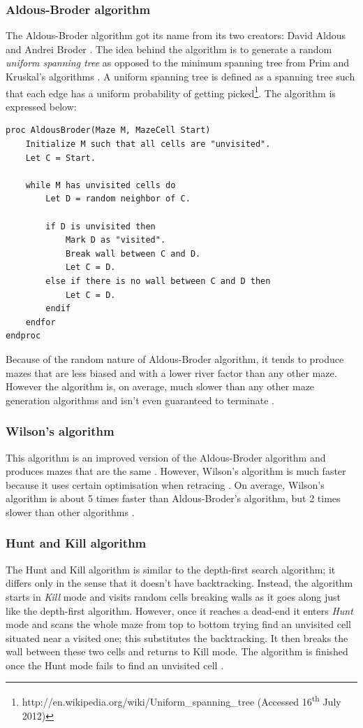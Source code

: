 \subsubsection{Aldous-Broder algorithm}
The Aldous-Broder algorithm got its name from its two creators: David Aldous and Andrei Broder \citep{DBLP:journals/siamdm/Aldous90}. The idea behind the algorithm is to generate a random {\em uniform spanning tree} as opposed to the minimum spanning tree from Prim and Kruskal's algorithms \citep{DBLP:conf/focs/Broder89}. A uniform spanning tree is defined as a spanning tree such that each edge has a uniform probability of getting picked\footnote{http://en.wikipedia.org/wiki/Uniform\_spanning\_tree (Accessed 16\textsuperscript{th} July 2012)}. The algorithm is expressed below:

\lstAlgo
\begin{lstlisting}
proc AldousBroder(Maze M, MazeCell Start)
	Initialize M such that all cells are "unvisited".
	Let C = Start.
	
	while M has unvisited cells do
		Let D = random neighbor of C.
		
		if D is unvisited then
			Mark D as "visited".
			Break wall between C and D.
			Let C = D.
		else if there is no wall between C and D then
			Let C = D.
		endif
	endfor
endproc
\end{lstlisting}

Because of the random nature of Aldous-Broder algorithm, it tends to produce mazes that are less biased and with a lower river factor than any other maze. However the algorithm is, on average, much slower than any other maze generation algorithms and isn't even guaranteed to terminate \citep{ThinkLabyrinth}.

\subsubsection{Wilson's algorithm}
This algorithm is an improved version of the Aldous-Broder algorithm and produces mazes that are the same \citep{ThinkLabyrinth}. However, Wilson's algorithm is much faster because it uses certain optimisation when retracing \citep{DBLP:conf/stoc/Wilson96}. On average, Wilson's algorithm is about 5 times faster than Aldous-Broder's algorithm, but 2 times slower than other algorithms \citep{ThinkLabyrinth}. 

\subsubsection{Hunt and Kill algorithm}
The Hunt and Kill algorithm is similar to the depth-first search algorithm; it differs only in the sense that it doesn't have backtracking. Instead, the algorithm starts in {\em Kill} mode and visits random cells breaking walls as it goes along just like the depth-first algorithm. However, once it reaches a dead-end it enters {\em Hunt} mode and scans the whole maze from top to bottom trying find an unvisited cell situated near a visited one; this substitutes the backtracking. It then breaks the wall between these two cells and returns to Kill mode. The algorithm is finished once the Hunt mode fails to find an unvisited cell \citep{ThinkLabyrinth}.

